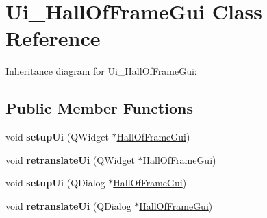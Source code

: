 \hypertarget{class_ui___hall_of_frame_gui}{}\section{Ui\+\_\+\+Hall\+Of\+Frame\+Gui Class Reference}
\label{class_ui___hall_of_frame_gui}


Inheritance diagram for Ui\+\_\+\+Hall\+Of\+Frame\+Gui\+:
\subsection*{Public Member Functions}
\begin{DoxyCompactItemize}
\item 
\mbox{\label{class_ui___hall_of_frame_gui_adc3c5aa8e33e7c8c16f62026da7538dc}} 
void {\bfseries setup\+Ui} (Q\+Widget $\ast$\hyperlink{class_hall_of_frame_gui}{Hall\+Of\+Frame\+Gui})
\item 
\mbox{\label{class_ui___hall_of_frame_gui_ab031e275fabf8c3a8a8f0a91e251c85d}} 
void {\bfseries retranslate\+Ui} (Q\+Widget $\ast$\hyperlink{class_hall_of_frame_gui}{Hall\+Of\+Frame\+Gui})
\item 
\mbox{\label{class_ui___hall_of_frame_gui_aeba89727b3d31ba78633f50695c53080}} 
void {\bfseries setup\+Ui} (Q\+Dialog $\ast$\hyperlink{class_hall_of_frame_gui}{Hall\+Of\+Frame\+Gui})
\item 
\mbox{\label{class_ui___hall_of_frame_gui_a9cad429afeeaf7e406c80e819b80d118}} 
void {\bfseries retranslate\+Ui} (Q\+Dialog $\ast$\hyperlink{class_hall_of_frame_gui}{Hall\+Of\+Frame\+Gui})
\end{DoxyCompactItemize}
